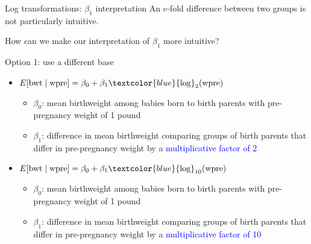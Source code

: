 \documentclass[10pt,t]{beamer}
\begin{document}
\begin{frame}{Log transformations: $\beta_1$ interpretation}
An $e$-fold difference between two groups is not particularly intuitive.

How can we make our interpretation of $\beta_1$ more intuitive?

\vspace{0.3cm}

Option 1: use a different base\pause

\begin{itemize}
	\item $E[\text{bwt} \mid \text{wpre}] = \beta_0 + \beta_1 \textcolor{blue}{\text{log}}_2 (\text{wpre})$
	\begin{itemize}
		\item $\beta_0$: mean birthweight among babies born to birth parents with pre-pregnancy weight of 1 pound
		\item $\beta_1$: difference in mean birthweight comparing groups of birth parents that differ in pre-pregnancy weight by a \textcolor{blue}{multiplicative factor of 2}
	\end{itemize} \pause
\item $E[\text{bwt} \mid \text{wpre}] = \beta_0 + \beta_1 \textcolor{blue}{\text{log}}_{10} (\text{wpre})$
\begin{itemize}
	\item $\beta_0$: mean birthweight among babies born to birth parents with pre-pregnancy weight of 1 pound
	\item $\beta_1$: difference in mean birthweight comparing groups of birth parents that differ in pre-pregnancy weight by a \textcolor{blue}{multiplicative factor of 10}
\end{itemize} 
\end{itemize}
\end{frame}
\end{document}
